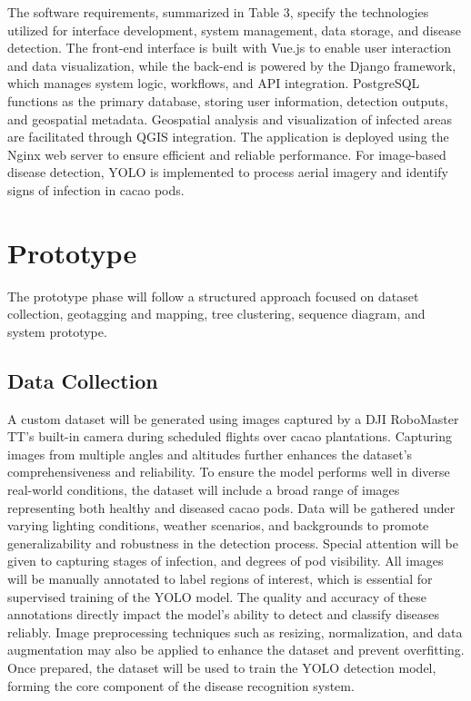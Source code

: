 	The software requirements, summarized in Table 3, specify the technologies utilized for interface development, system management, data storage, and disease detection. The front-end interface is built with Vue.js to enable user interaction and data visualization, while the back-end is powered by the Django framework, which manages system logic, workflows, and API integration. PostgreSQL functions as the primary database, storing user information, detection outputs, and geospatial metadata. Geospatial analysis and visualization of infected areas are facilitated through QGIS integration. The application is deployed using the Nginx web server to ensure efficient and reliable performance. For image-based disease detection, YOLO is implemented to process aerial imagery and identify signs of infection in cacao pods.
	
	\section{Prototype} 
	The prototype phase will follow a structured approach focused on dataset collection, geotagging and mapping, tree clustering, sequence diagram, and system prototype.
	
	\subsection{Data Collection}
	A custom dataset will be generated using images captured by a DJI RoboMaster TT’s built-in camera during scheduled flights over cacao plantations. Capturing images from multiple angles and altitudes further enhances the dataset’s comprehensiveness and reliability. To ensure the model performs well in diverse real-world conditions, the dataset will include a broad range of images representing both healthy and diseased cacao pods. Data will be gathered under varying lighting conditions, weather scenarios, and backgrounds to promote generalizability and robustness in the detection process. Special attention will be given to capturing stages of infection, and degrees of pod visibility. All images will be manually annotated to label regions of interest, which is essential for supervised training of the YOLO model. The quality and accuracy of these annotations directly impact the model’s ability to detect and classify diseases reliably. Image preprocessing techniques such as resizing, normalization, and data augmentation may also be applied to enhance the dataset and prevent overfitting. Once prepared, the dataset will be used to train the YOLO detection model, forming the core component of the disease recognition system.
	
